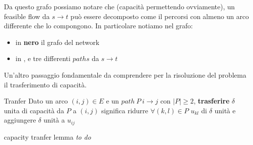 \documentclass[a4paper, 11pt]{report}
\begin{document}
Da questo grafo possiamo notare che (capacità permettendo ovviamente), un feasible flow da $s \rightarrow t$ può essere decomposto come il percorsi con almeno un arco 
differente che lo compongono. In particolare notiamo nel grafo:
\begin{itemize}
    \item  in \textbf{nero} il grafo del network
    \item in \textbf{\color{red}{rosso}}, \textbf{\color{green!70!black}{verde}} e \textbf{\color{blue}{blu}} tre differenti $paths$ da $s\rightarrow t$
\end{itemize}

Un'altro passaggio fondamentale da comprendere per la risoluzione del problema il trasferimento di capacità.
\begin{definition}{Tranfer}{}
    Dato un arco $(i,j) \in E$ e un $path\ P\ i\rightarrow j$ con $|P|\ge 2$, \textbf{trasferire} $\delta$ unita di capacità da $P$ a $(i,j)$
    significa ridurre $\forall (k,l) \in P$ $u_{kl}$ di $\delta$ unità e aggiungere $\delta$ unità a $u_{ij}$ 
\end{definition}
\begin{lemma}{capacity tranfer lemma}{}
    \textit{to do}
\end{lemma}
\newpage
\end{document}
